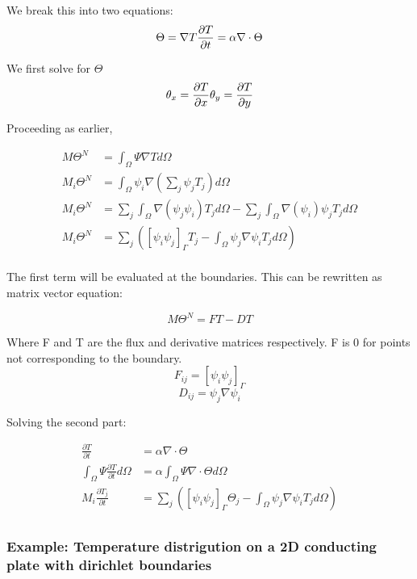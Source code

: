 \documentclass[11pt]{article}
\begin{document}
We break this into two equations: \[\Theta = \nabla T \\
\frac{\partial T}{\partial t} = \alpha \nabla \cdot \Theta\]

We first solve for \(\Theta\)
\[ \theta_x = \frac{\partial T}{\partial x} \\ \theta_y = \frac{\partial T}{\partial y}\]

Proceeding as earlier,

\begin{align}
 M\Theta^N &= \int_{\Omega}\Psi \nabla T d\Omega \\
 M_i\Theta^N &= \int_{\Omega}\psi_i \nabla  (\sum_j \psi_j T_j) d\Omega \\
 M_i\Theta^N &=  \sum_j \int_{\Omega}\nabla(\psi_j \psi_i) T_j d\Omega - \sum_j \int_{\Omega}\nabla( \psi_i )\psi_j T_j d\Omega\\
 M_i\Theta^N &= \sum_j ([\psi_i \psi_j]_{\Gamma} T_j - \int_{\Omega}\psi_j\nabla\psi_i T_j d\Omega)\\
\end{align}

The first term will be evaluated at the boundaries. This can be
rewritten as matrix vector equation:

\[M\Theta^N = FT - DT\]

Where F and T are the flux and derivative matrices respectively. F is 0
for points not corresponding to the boundary.
\[F_{ij} = [\psi_i \psi_j]_{\Gamma}\] \[D_{ij} = \psi_j\nabla\psi_i\]

Solving the second part:

\begin{align}
\frac{\partial T}{\partial t} &= \alpha \nabla \cdot \Theta\\
\int_\Omega \Psi \frac{\partial T}{\partial t} d\Omega &= \alpha \int_\Omega \Psi \nabla \cdot \Theta d\Omega\\
M_i\frac{\partial T_j}{\partial t} &= \sum_j ([\psi_i \psi_j]_{\Gamma} \Theta_j - \int_{\Omega}\psi_j\nabla\psi_i T_j d\Omega)\\
\end{align}


    \subsubsection{Example: Temperature distrigution on a 2D conducting
plate with dirichlet
boundaries}\label{example-temperature-distrigution-on-a-2d-conducting-plate-with-dirichlet-boundaries}
\end{document}
